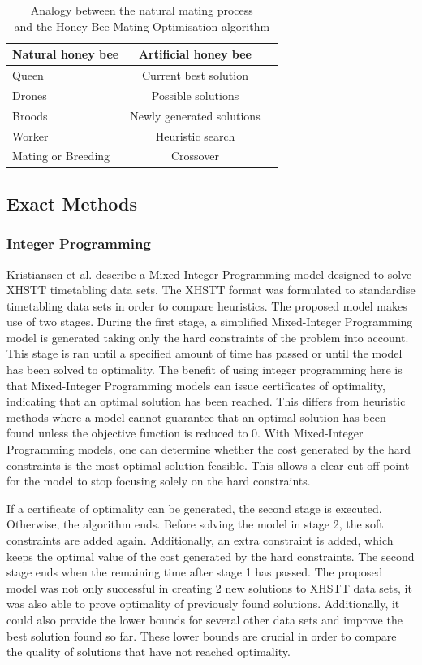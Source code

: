 \begin{table}[H]
	\caption{Analogy between the natural mating process\\ and the Honey-Bee Mating Optimisation algorithm}
	\label{tab:hbmo}
	\centering
	\begin{tabular}{l c c }
		\hline
		\textbf{Natural honey bee}  & \textbf{Artificial honey bee} \\ \hline
		Queen & Current best solution \\
		Drones & Possible solutions \\
	    Broods & Newly generated solutions \\
            Worker & Heuristic search \\
            Mating or Breeding & Crossover \\ \hline
	\end{tabular}
\end{table}

\subsection{Exact Methods}
\subsubsection{Integer Programming}

Kristiansen et al. \cite{kristiansen2015} describe a Mixed-Integer Programming model designed to solve XHSTT timetabling data sets. The XHSTT format was formulated to standardise timetabling data sets in order to compare heuristics. The proposed model makes use of two stages. During the first stage, a simplified Mixed-Integer Programming model is generated taking only the hard constraints of the problem into account. This stage is ran until a specified amount of time has passed or until the model has been solved to optimality. The benefit of using integer programming here is that Mixed-Integer Programming models can issue certificates of optimality, indicating that an optimal solution has been reached. This differs from heuristic methods where a model cannot guarantee that an optimal solution has been found unless the objective function is reduced to 0. With Mixed-Integer Programming models, one can determine whether the cost generated by the hard constraints is the most optimal solution feasible. This allows a clear cut off point for the model to stop focusing solely on the hard constraints. 

If a certificate of optimality can be generated, the second stage is executed. Otherwise, the algorithm ends. Before solving the model in stage 2, the soft constraints are added again. Additionally, an extra constraint is added, which keeps the optimal value of the cost generated by the hard constraints. The second stage ends when the remaining time after stage 1 has passed. The proposed model was not only successful in creating 2 new solutions to XHSTT data sets, it was also able to prove optimality of previously found solutions. Additionally, it could also provide the lower bounds for several other data sets and improve the best solution found so far. These lower bounds are crucial in order to compare the quality of solutions that have not reached optimality.

